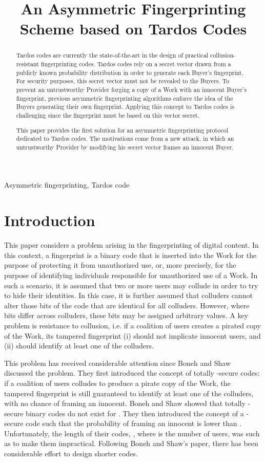 \documentclass{article}
\title{An Asymmetric Fingerprinting Scheme based on Tardos Codes}
\begin{document}
\maketitle
\begin{abstract}

Tardos codes are currently the state-of-the-art in the design of
practical collusion-resistant fingerprinting codes.
Tardos codes rely on a secret vector drawn from a publicly known probability
distribution in order to generate each
Buyer's fingerprint.  For security purposes, this secret vector must not be revealed to
the Buyers.  To prevent an untrustworthy Provider forging a copy of a
Work with an innocent Buyer's fingerprint, previous asymmetric
fingerprinting algorithms enforce the idea of the Buyers generating their own
fingerprint. Applying this concept to Tardos codes is challenging since the
fingerprint must be based on this vector secret.

This paper provides the first solution for an
asymmetric fingerprinting protocol dedicated to Tardos codes.
The motivations come from a new attack, in which an
untrustworthy Provider by modifying his secret vector frames an innocent Buyer.

\end{abstract}
\begin{keywords}
Asymmetric fingerprinting, Tardos code
\end{keywords}
\section{Introduction}
This paper considers a problem arising in the fingerprinting of
digital content.  In this context, a fingerprint is a binary code that
is inserted into the Work for the purpose of protecting it from
unauthorized use, or, more precisely, for the purpose of identifying
individuals responsible for unauthorized use of a Work.
In such a scenario, it is assumed that two or more users
may collude in order to try to hide their identities.  In this case,
it is further assumed that colluders cannot alter those bits of the
code that are identical for all colluders.  However, where bits differ
across colluders, these bits may be assigned arbitrary values.  A key
problem is resistance to collusion, i.e. if a coalition of  users
creates a pirated copy of the Work, its tampered fingerprint (i) should not
implicate innocent users, and (ii) should identify at least one of
the colluders.

This problem has received considerable attention since Boneh and
Shaw~\cite{Boneh1998Collusion} discussed the problem.
They first introduced the concept of totally -secure codes:
if a coalition of  users colludes to produce a
pirate copy of the Work, the tampered fingerprint is still guaranteed to identify at
least one of the colluders, with no chance of framing an innocent.
Boneh and Shaw showed that totally
-secure binary codes do not exist for . They then introduced the
concept of a -secure code such that the probability of framing an innocent is lower than .
Unfortunately, the length of
their codes, , where  is the
number of users, was such as to make them impractical.
Following Boneh and Shaw's paper, there has been considerable
effort to design shorter codes.
\end{document}
